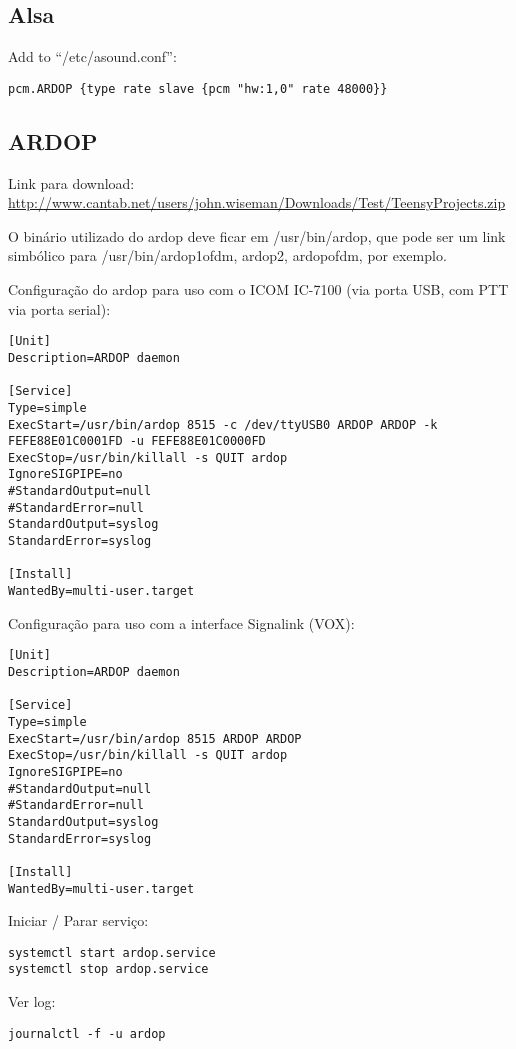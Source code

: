 \documentclass[11pt,a4paper]{article}
\begin{document}
\subsection{Alsa}

Add to ``/etc/asound.conf'':
\begin{verbatim}
pcm.ARDOP {type rate slave {pcm "hw:1,0" rate 48000}}
\end{verbatim}

\subsection{ARDOP}

Link para download: \url{http://www.cantab.net/users/john.wiseman/Downloads/Test/TeensyProjects.zip}

O binário utilizado do ardop deve ficar em /usr/bin/ardop, que pode ser um
link simbólico para /usr/bin/{ardop1ofdm, ardop2, ardopofdm}, por exemplo.

Configuração do ardop para uso com o ICOM IC-7100 (via porta USB, com PTT
via porta serial):
\begin{verbatim}
[Unit]
Description=ARDOP daemon

[Service]
Type=simple
ExecStart=/usr/bin/ardop 8515 -c /dev/ttyUSB0 ARDOP ARDOP -k FEFE88E01C0001FD -u FEFE88E01C0000FD
ExecStop=/usr/bin/killall -s QUIT ardop
IgnoreSIGPIPE=no
#StandardOutput=null
#StandardError=null
StandardOutput=syslog
StandardError=syslog

[Install]
WantedBy=multi-user.target
\end{verbatim}

Configuração para uso com a interface Signalink (VOX):
\begin{verbatim}
[Unit]
Description=ARDOP daemon

[Service]
Type=simple
ExecStart=/usr/bin/ardop 8515 ARDOP ARDOP
ExecStop=/usr/bin/killall -s QUIT ardop
IgnoreSIGPIPE=no
#StandardOutput=null
#StandardError=null
StandardOutput=syslog
StandardError=syslog

[Install]
WantedBy=multi-user.target
\end{verbatim}


Iniciar / Parar serviço:
\begin{verbatim}
systemctl start ardop.service
systemctl stop ardop.service
\end{verbatim}


Ver log:
\begin{verbatim}
journalctl -f -u ardop
\end{verbatim}
\end{document}
